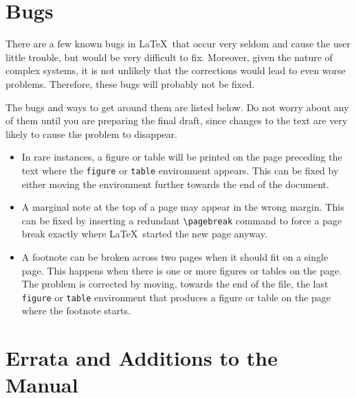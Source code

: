 %
%


\section{Bugs}

There are a few known bugs in \LaTeX\ that occur very seldom and
cause the user little trouble, but would be very difficult to fix.
Moreover, given the nature of complex systems, it is not unlikely that
the corrections would lead to even worse problems.  Therefore, these
bugs will probably not be fixed.

The bugs and ways to get around them are listed below.  Do not worry
about any of them until you are preparing the final draft, since
changes to the text are very likely to cause the problem to disappear.
\begin{itemize}
\item In rare instances, a figure or table will be printed on the page
preceding the text where the {\tt figure} or {\tt table} environment
appears.  This can be fixed by either moving the environment further
towards the end of the document.

\item A marginal note at the top of a page may appear in the wrong
margin.  This can be fixed by inserting a redundant \verb|\pagebreak|
command to force a page break exactly where \LaTeX\ started the new
page anyway.

\item A footnote can be broken across two pages when it should fit on a
single page.  This happens when there is one or more figures or tables
on the page.  The problem is corrected by moving, towards the end of the
file, the last {\tt figure} or {\tt table} environment that produces a
figure or table on the page where the footnote starts.
\end{itemize}


\section{Errata and Additions to the Manual}




